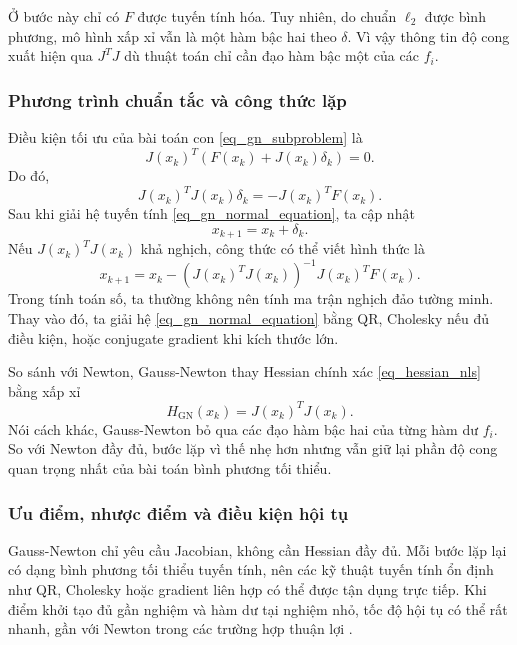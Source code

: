 Ở bước này chỉ có $F$ được tuyến tính hóa. Tuy nhiên, do chuẩn $\ell_2$ được bình phương, mô hình xấp xỉ vẫn là một hàm bậc hai theo $\delta$. Vì vậy thông tin độ cong xuất hiện qua $J^{T}J$ dù thuật toán chỉ cần đạo hàm bậc một của các $f_i$.

\subsubsection*{Phương trình chuẩn tắc và công thức lặp}
Điều kiện tối ưu của bài toán con \eqref{eq_gn_subproblem} là
\begin{equation}
    J(x_k)^{T}\left(F(x_k)+J(x_k)\delta_k\right)=0.
    \label{eq_gn_first_order}
\end{equation}
Do đó,
\begin{equation}
    J(x_k)^{T}J(x_k)\delta_k=-J(x_k)^{T}F(x_k).
    \label{eq_gn_normal_equation}
\end{equation}
Sau khi giải hệ tuyến tính \eqref{eq_gn_normal_equation}, ta cập nhật
\begin{equation}
    x_{k+1}=x_k+\delta_k.
    \label{eq_gn_update}
\end{equation}
Nếu $J(x_k)^{T}J(x_k)$ khả nghịch, công thức có thể viết hình thức là
\begin{equation}
    x_{k+1}=x_k-
    \left(J(x_k)^{T}J(x_k)\right)^{-1}J(x_k)^{T}F(x_k).
    \label{eq_gn_update_inverse}
\end{equation}
Trong tính toán số, ta thường không nên tính ma trận nghịch đảo tường minh. Thay vào đó, ta giải hệ \eqref{eq_gn_normal_equation} bằng QR, Cholesky nếu đủ điều kiện, hoặc conjugate gradient khi kích thước lớn.
\medskip

So sánh với Newton, Gauss-Newton thay Hessian chính xác \eqref{eq_hessian_nls} bằng xấp xỉ
\begin{equation}
    H_{\mathrm{GN}}(x_k)=J(x_k)^{T}J(x_k).
    \label{eq_gn_hessian_approx}
\end{equation}
Nói cách khác, Gauss-Newton bỏ qua các đạo hàm bậc hai của từng hàm dư $f_i$. So với Newton đầy đủ, bước lặp vì thế nhẹ hơn nhưng vẫn giữ lại phần độ cong quan trọng nhất của bài toán bình phương tối thiểu.

\subsubsection*{Ưu điểm, nhược điểm và điều kiện hội tụ}
Gauss-Newton chỉ yêu cầu Jacobian, không cần Hessian đầy đủ. Mỗi bước lặp lại có dạng bình phương tối thiểu tuyến tính, nên các kỹ thuật tuyến tính ổn định như QR, Cholesky hoặc gradient liên hợp có thể được tận dụng trực tiếp. Khi điểm khởi tạo đủ gần nghiệm và hàm dư tại nghiệm nhỏ, tốc độ hội tụ có thể rất nhanh, gần với Newton trong các trường hợp thuận lợi \cite{NocedalWright2006}.
\medskip

